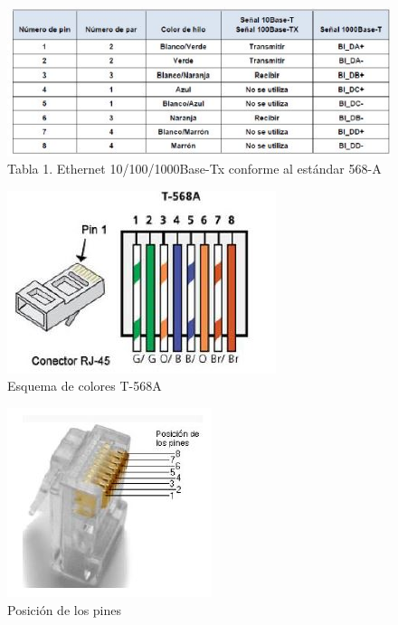 \documentclass[journal]{IEEEtran}
\begin{document}
\begin{center}
\begin{figure}[H]
\centering
\includegraphics[scale=0.75]{1.JPG} 
\caption{Tabla 1. Ethernet 10/100/1000Base-Tx conforme al estándar 568-A}
\end{figure}
\end{center}
\begin{center}
\begin{figure}[H]
\centering
\includegraphics[scale=0.75]{2.JPG} 
\caption{Esquema de colores T-568A}
\end{figure}
\end{center}
\begin{center}
\begin{figure}[H]
\centering
\includegraphics[scale=0.75]{3.JPG} 
\caption{Posición de los pines}
\end{figure}
\end{center}
\end{document}
